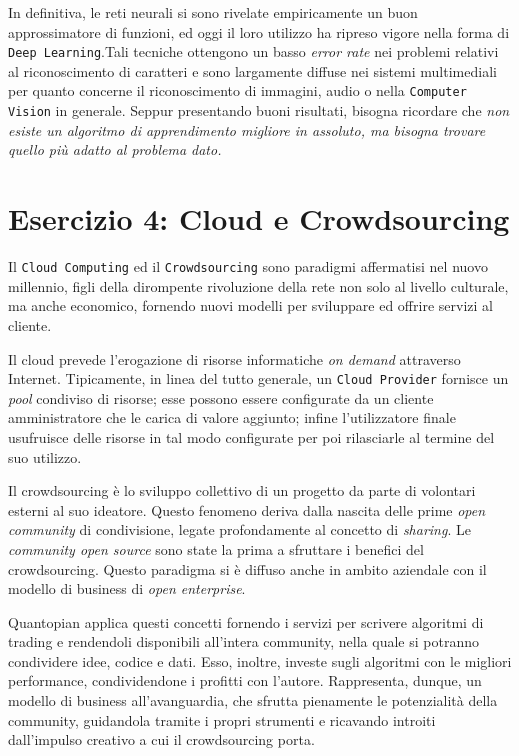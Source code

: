 			In definitiva, le reti neurali si sono rivelate empiricamente un buon approssimatore di funzioni, ed oggi il loro utilizzo ha ripreso vigore nella forma di \texttt{Deep Learning}.Tali tecniche ottengono un basso \emph{error rate} nei problemi relativi al riconoscimento di caratteri e sono largamente diffuse nei sistemi multimediali per quanto concerne il riconoscimento di immagini, audio o nella \texttt{Computer Vision} in generale. Seppur presentando buoni risultati, bisogna ricordare che \emph{non esiste un algoritmo di apprendimento migliore in assoluto, ma bisogna trovare quello più adatto al problema dato.}
			
		\section{Esercizio 4: Cloud e Crowdsourcing}
			\label{sec:es4}
			Il \texttt{Cloud Computing} ed il \texttt{Crowdsourcing} sono paradigmi affermatisi nel nuovo millennio, figli della dirompente rivoluzione della rete non solo al livello culturale, ma anche economico, fornendo nuovi modelli per sviluppare ed offrire servizi al cliente.\par
			Il cloud prevede l'erogazione di risorse informatiche \emph{on demand} attraverso Internet. Tipicamente, in linea del tutto generale, un \texttt{Cloud Provider} fornisce un \emph{pool} condiviso di risorse; esse possono essere configurate da un cliente amministratore che le carica di valore aggiunto; infine l'utilizzatore finale usufruisce delle risorse in tal modo configurate per poi rilasciarle al termine del suo utilizzo.\par
			Il crowdsourcing è lo sviluppo collettivo di un progetto da parte di volontari esterni al suo ideatore. Questo fenomeno deriva dalla nascita delle prime \emph{open community} di condivisione, legate profondamente al concetto di \emph{sharing}. Le \emph{community open source} sono state la prima a sfruttare i benefici del crowdsourcing. Questo paradigma si è diffuso anche in ambito aziendale con il modello di business di \emph{open enterprise}.\par
			Quantopian applica questi concetti fornendo i servizi per scrivere algoritmi di trading e rendendoli disponibili all'intera community, nella quale si potranno condividere idee, codice e dati. Esso, inoltre, investe sugli algoritmi con le migliori performance, condividendone i profitti con l'autore. Rappresenta, dunque, un modello di business all'avanguardia, che sfrutta pienamente le potenzialità della community, guidandola tramite i propri strumenti e ricavando introiti dall'impulso creativo a cui il crowdsourcing porta.
